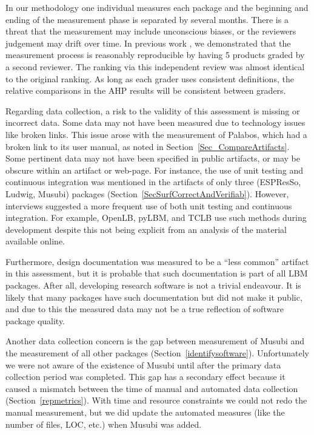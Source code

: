 \documentclass[final, 3p, times, authoryear]{elsarticle}
\begin{document}
In our methodology one individual measures each package and the beginning and
ending of the measurement phase is separated by several months.  There is a
threat that the measurement may include unconscious biases, or the reviewers
judgement may drift over time.  In previous work \citep{SmithEtAl2016}, we
demonstrated that the measurement process is reasonably reproducible by having 5
products graded by a second reviewer. The ranking via this independent review
was almost identical to the original ranking. As long as each grader uses
consistent definitions, the relative comparisons in the AHP results will be
consistent between graders.

Regarding data collection, a risk to the validity of this assessment is missing
or incorrect data. Some data may not have been measured due to technology issues
like broken links. This issue arose with the measurement of Palabos, which had a
broken link to its user manual, as noted in Section~\ref{Sec_CompareArtifacts}.
Some pertinent data may not have been specified in public artifacts, or may be
obscure within an artifact or web-page. For instance, the use of unit testing
and continuous integration was mentioned in the artifacts of only three
(ESPResSo, Ludwig, Musubi) packages (Section~\ref{SecSurfCorrectAndVerifiab}).
However, interviews suggested a more frequent use of both unit testing and
continuous integration. For example, OpenLB, pyLBM, and TCLB use such methods
during development despite this not being explicit from an analysis of the
material available online. 

Furthermore, design documentation was measured to be a ``less common'' artifact
in this assessment, but it is probable that such documentation is part of all
LBM packages. After all, developing research software is not a trivial
endeavour. It is likely that many packages have such documentation but did not
make it public, and due to this the measured data may not be a true reflection
of software package quality.

Another data collection concern is the gap between measurement of Musubi and the
measurement of all other packages (Section~\ref{identifysoftware}).
Unfortunately we were not aware of the existence of Musubi until after the
primary data collection period was completed. This gap has a secondary effect
because it caused a mismatch between the time of manual and automated data
collection (Section~\ref{repmetrics}).  With time and resource constraints we
could not redo the manual measurement, but we did update the automated measures
(like the number of files, LOC, etc.) when Musubi was added.
\end{document}
